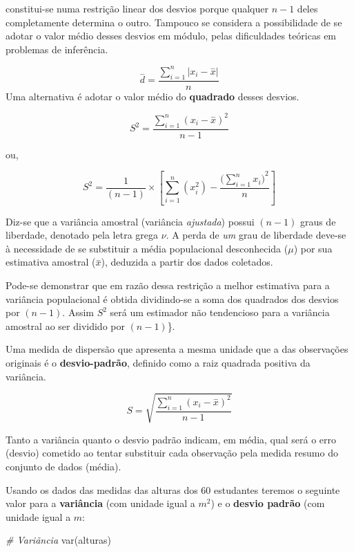 \documentclass[
]{book}
\newenvironment{Shaded}{\begin{snugshade}}{\end{snugshade}}
\newcommand{\CommentTok}[1]{\textcolor[rgb]{0.56,0.35,0.01}{\textit{#1}}}
\newcommand{\FunctionTok}[1]{\textcolor[rgb]{0.00,0.00,0.00}{#1}}
\newcommand{\NormalTok}[1]{#1}
\begin{document}
constitui-se numa restrição linear dos desvios porque qualquer \(n-1\) deles completamente determina o outro. Tampouco se considera a possibilidade de se adotar o valor médio desses desvios em módulo, pelas dificuldades teóricas em problemas de inferência.

\[
\stackrel{-}{d}  = \frac{\sum _{i=1}^{n}\left|x_{i}-\stackrel{-}{x}\right|}{n}
\]
Uma alternativa é adotar o valor médio do \textbf{quadrado} desses desvios.

\[
S^{2}=\frac{\sum _{i=1}^{n}\left(x_{i}-\stackrel{-}{x}\right)^{2}}{n-1}
\]

ou,

\[
S^{2}=\frac{1}{(n-1)} \times \left[ \sum _{i=1}^{n} (x_{i}^{2}) - \frac{({\sum _{i=1}^{n}x_{i})}^{2} }{n}\right]
\]

Diz-se que a variância amostral (variância \emph{ajustada}) possui \((n-1)\) graus de liberdade, denotado pela letra grega \(\nu\). A perda de \emph{um} grau de liberdade deve-se à necessidade de se substituir a média populacional desconhecida (\(\mu\)) por sua estimativa amostral (\(\stackrel{-}{x}\)), deduzida a partir dos dados coletados.

Pode-se demonstrar que em razão dessa restrição a melhor estimativa para a variância populacional é obtida dividindo-se a soma dos quadrados dos desvios por \((n-1)\). Assim \(S^{2}\) será um estimador não tendencioso para a variância amostral ao ser dividido por \((n-1)\)\}.

Uma medida de dispersão que apresenta a mesma unidade que a das observações originais é o \textbf{desvio-padrão}, definido como a raiz quadrada positiva da variância.

\[
S= \sqrt{\frac{\sum _{i=1}^{n}\left(x_{i}-\stackrel{-}{x}\right)^{2}}{n-1}}
\]

Tanto a variância quanto o desvio padrão indicam, em média, qual será o erro (desvio) cometido ao tentar substituir cada observação pela medida resumo do conjunto de dados (média).

Usando os dados das medidas das alturas dos 60 estudantes teremos o seguinte valor para a \textbf{variância} (com unidade igual a \(m^{2}\)) e o \textbf{desvio padrão} (com unidade igual a \(m\):

\begin{Shaded}
\begin{Highlighting}[]
\CommentTok{\# Variãncia}
\FunctionTok{var}\NormalTok{(alturas)}
\end{Highlighting}
\end{Shaded}
\end{document}
